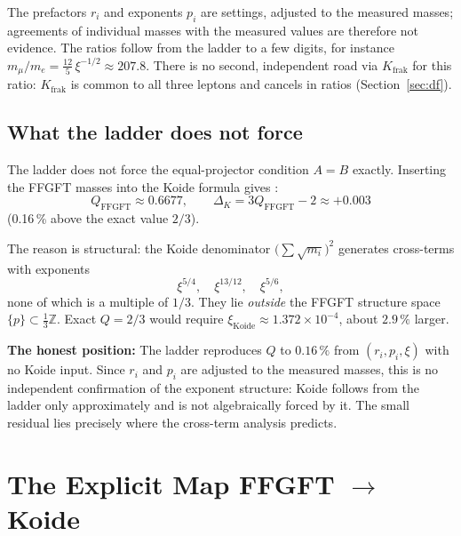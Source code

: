 The prefactors \(r_i\) and exponents \(p_i\) are settings, adjusted to the
measured masses; agreements of individual masses with the measured values
are therefore not evidence. The ratios follow from the ladder to a few
digits, for instance
\(m_\mu/m_e = \tfrac{12}{5}\,\xi^{-1/2} \approx 207.8\).
There is no second, independent road via \(K_{\text{frak}}\) for this
ratio: \(K_{\text{frak}}\) is common to all three leptons and cancels in
ratios (Section~\ref{sec:df}).

\subsection*{What the ladder does not force}

The ladder does not force the equal-projector condition \(A = B\) exactly.
Inserting the FFGFT masses into the Koide formula gives \cite{PascherDok192}:
\begin{equation}
  Q_{\text{FFGFT}} \approx 0.6677,
  \qquad
  \Delta_K = 3Q_{\text{FFGFT}} - 2 \approx +0.003
\end{equation}
(0.16\,\% above the exact value \(2/3\)).

The reason is structural: the Koide denominator
\(\bigl(\sum\sqrt{m_i}\bigr)^2\) generates cross-terms with exponents
\begin{equation}
  \xi^{5/4}, \quad \xi^{13/12}, \quad \xi^{5/6},
\end{equation}
none of which is a multiple of \(1/3\). They lie \emph{outside} the FFGFT
structure space \(\{p\} \subset \tfrac{1}{3}\mathbb{Z}\).
Exact \(Q = 2/3\) would require
\(\xi_{\text{Koide}} \approx 1.372\times10^{-4}\), about \(2.9\,\%\) larger.

\textbf{The honest position:}
The ladder reproduces \(Q\) to \(0.16\,\%\) from
\((r_i, p_i, \xi)\) with no Koide input.
Since \(r_i\) and \(p_i\) are adjusted to the measured masses, this is
no independent confirmation of the exponent structure: Koide follows from
the ladder only approximately and is not algebraically forced by it.
The small residual lies precisely where the cross-term analysis predicts.

\section{The Explicit Map FFGFT \texorpdfstring{\(\to\)}{→} Koide}

